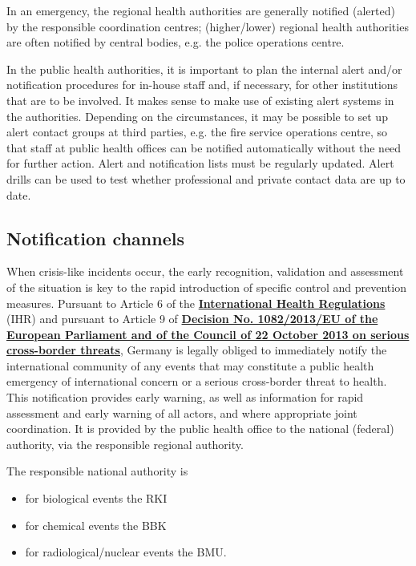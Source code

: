 \documentclass{article}
\begin{document}
In an emergency, the regional health authorities are generally notified (alerted) by the responsible coordination centres; (higher/lower) regional health authorities are often notified by central bodies, e.g. the police operations centre.


In the public health authorities, it is important to plan the internal alert and/or notification procedures for in-house staff and, if necessary, for other institutions that are to be involved. It makes sense to make use of existing alert systems in the authorities. Depending on the circumstances, it may be possible to set up alert contact groups at third parties, e.g. the fire service operations centre, so that staff at public health offices can be notified automatically without the need for further action. Alert and notification lists must be regularly updated. Alert drills can be used to test whether professional and private contact data are up to date.


\subsection{Notification channels}\label{H6049071}



When crisis-like incidents occur, the early recognition, validation and assessment of the situation is key to the rapid introduction of specific control and prevention measures. Pursuant to Article 6 of the \textbf{\href{https://www.rki.de/DE/Content/Infekt/IGV/Gesetz_IGV_de-en.pdf}{International Health Regulations}} (IHR) and pursuant to Article 9 of \textbf{\href{https://eur-lex.europa.eu/legal-content/EN/TXT/?uri=celex%3A32013D1082}{Decision No. 1082/2013/EU of the European Parliament and of the Council of 22 October 2013 on serious cross-border threats}}, Germany is legally obliged to immediately notify the international community of any events that may constitute a public health emergency of international concern or a serious cross-border threat to health. This notification provides early warning, as well as information for rapid assessment and early warning of all actors, and where appropriate joint coordination. It is provided by the public health office to the national (federal) authority, via the responsible regional authority.


The responsible national authority is

\begin{itemize}
\item for biological events the RKI


\item for chemical events the BBK


\item for radiological/nuclear events the BMU.


\end{itemize}
\end{document}
